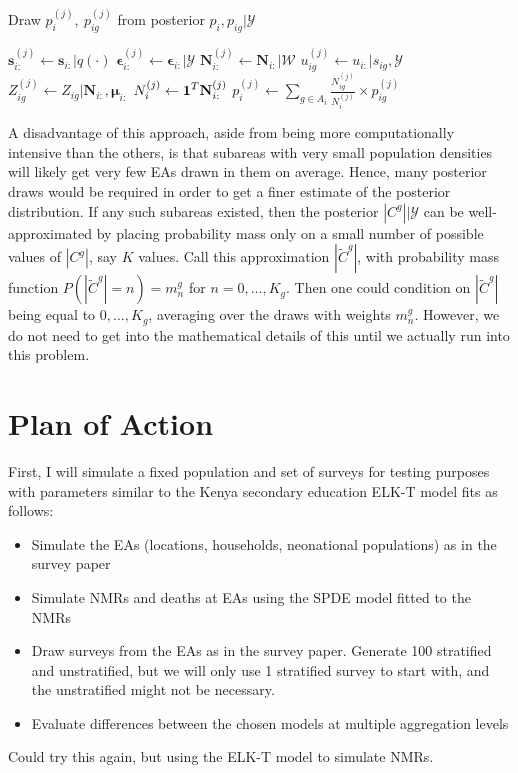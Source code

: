 \documentclass[12pt]{article}
\newcommand{\bmone}{\mbox{\bf 1}}
\begin{document}
\begin{algorithm}[H]
\caption{Draw $p_i^{(j)}, \ p_{ig}^{(j)}$ from posterior $p_i, p_{ig} \vert  \mathscr{Y}$}
\label{alg:main}
\begin{algorithmic}[1]
\STATE $\mathbf{s}_{i:}^{(j)}\leftarrow \mathbf{s}_{i:} \vert q( \cdot )$
\STATE $\boldsymbol{ \epsilon }_{i:}^{(j)} \leftarrow \boldsymbol{ \epsilon }_{i:}  \vert  \mathscr{Y} $
\STATE $\mathbf{N}_{i:}^{(j)} \leftarrow \mathbf{N}_{i:} \vert \mathscr{W}$
\STATE $u_{ig}^{(j)} \leftarrow u_{i:} \vert s_{ig}, \mathscr{Y}$
\STATE $Z_{ig}^{(j)} \leftarrow Z_{ig} \vert \mathbf{N}_{i:}, \boldsymbol{\mu}_{i:}$
\ENDFOR
\STATE $N_i^{(j)} \leftarrow \bmone^T \mathbf{N}_{i:}^{(j)}$
\STATE $p_i^{(j)} \leftarrow  \sum_{g \in A_i} \frac{N_{ig}^{(j)}}{N_{i}^{(j)}} \times p_{ig}^{(j)}$
\end{algorithmic}
\end{algorithm}

A disadvantage of this approach, aside from being more computationally intensive than the others, is that subareas with very small population densities will likely get very few EAs drawn in them on average. Hence, many posterior draws would be required in order to get a finer estimate of the posterior distribution. If any such subareas existed, then the posterior $|C^g| \vert \mathscr{Y}$ can be well-approximated by placing probability mass only on a small number of possible values of $|C^g|$, say $K$ values.  Call this approximation $|\tilde{C}^g|$, with probability mass function $P(|\tilde{C}^g|=n) = m_n^g$ for $n=0,...,K_g$. Then one could condition on $|\tilde{C}^g|$ being equal to $0, \ldots, K_g$, averaging over the draws with weights $m_n^g$.  However, we do not need to get into the mathematical details of this until we actually run into this problem.

\section{Plan of Action}

First, I will simulate a fixed population and set of surveys for testing purposes with parameters similar to the Kenya secondary education ELK-T model fits as follows:
\begin{itemize}
\item Simulate the EAs (locations, households, neonational populations) as in the survey paper
\item Simulate NMRs and deaths at EAs using the SPDE model fitted to the NMRs
\item Draw surveys from the EAs as in the survey paper. Generate 100 stratified and unstratified, but we will only use 1 stratified survey to start with, and the unstratified might not be necessary.
\item Evaluate differences between the chosen models at multiple aggregation levels
\end{itemize}
Could try this again, but using the ELK-T model to simulate NMRs.
\end{document}

